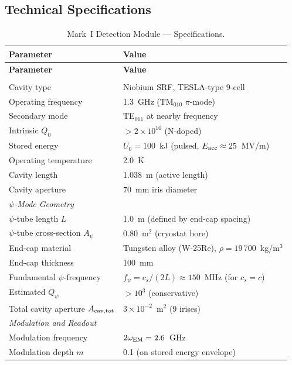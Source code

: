 \documentclass[11pt,a4paper]{article}
\begin{document}
\subsection{Technical Specifications}

\begin{longtable}{@{}p{6cm}p{8cm}@{}}
\caption{Mark~I Detection Module --- Specifications.} \label{tab:mk1} \\
\toprule
\textbf{Parameter} & \textbf{Value} \\
\midrule
\endfirsthead
\toprule
\textbf{Parameter} & \textbf{Value} \\
\midrule
\endhead
\bottomrule
\endfoot
\multicolumn{2}{l}{\textit{EM Cavity}} \\
\midrule
Cavity type & Niobium SRF, TESLA-type 9-cell \\
Operating frequency & 1.3~GHz (TM$_{010}$ $\pi$-mode) \\
Secondary mode & TE$_{011}$ at nearby frequency \\
Intrinsic $Q_0$ & $> 2\times 10^{10}$ (N-doped) \\
Stored energy & $U_0 = 100$~kJ (pulsed, $E_{\rm acc} \approx 25$~MV/m) \\
Operating temperature & 2.0~K \\
Cavity length & 1.038~m (active length) \\
Cavity aperture & $70$~mm iris diameter \\
\midrule
\multicolumn{2}{l}{\textit{$\psi$-Mode Geometry}} \\
\midrule
$\psi$-tube length $L$ & 1.0~m (defined by end-cap spacing) \\
$\psi$-tube cross-section $A_\psi$ & 0.80~m$^2$ (cryostat bore) \\
End-cap material & Tungsten alloy (W-25Re), $\rho = 19\,700$~kg/m$^3$ \\
End-cap thickness & 100~mm \\
Fundamental $\psi$-frequency & $f_\psi = c_s/(2L) \approx 150$~MHz (for $c_s = c$) \\
Estimated $Q_\psi$ & $> 10^3$ (conservative) \\
Total cavity aperture $A_{\rm cav,tot}$ & $3\times 10^{-2}$~m$^2$ (9 irises) \\
\midrule
\multicolumn{2}{l}{\textit{Modulation and Readout}} \\
\midrule
Modulation frequency & $2\omega_{\rm EM} = 2.6$~GHz \\
Modulation depth $m$ & 0.1 (on stored energy envelope) \\

\end{longtable}
\end{document}
